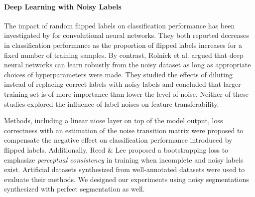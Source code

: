 \paragraph{Deep Learning with Noisy Labels}

The impact of random flipped labels on classification performance has been investigated by \cite{sukhbaatar2014training,patrini2016making} for convolutional neural networks.
They both reported decreases in classification performance as the proportion of flipped labels increases for a fixed number of training samples.
By contrast, Rolnick et al.\cite{rolnick2017deep} argued that deep neural networks can learn robustly from the noisy dataset as long as appropriate choices of hyperparameters were made.
They studied the effects of diluting instead of replacing correct labels with noisy labels and concluded that larger training set is of more importance than lower the level of noise.
Neither of these studies explored the influence of label noises on feature transferability.

Methods, including a linear niose layer on top of the model output\cite{sukhbaatar2014training}, loss correctness with an estimation of the noise transition matrix\cite{patrini2016making} were proposed to compensate the negative effect on classification performance introduced by flipped labels.
Additionally, Reed \& Lee\cite{reed2014training} proposed a bootstrapping loss to emphasize \textit{perceptual consistency} in training when incomplete and noisy labels exist.
Artificial datasets synthesized from well-annotated datasets were used to evaluate their methods.
We designed our experiments using noisy segmentations synthesized with perfect segmentation as well.


